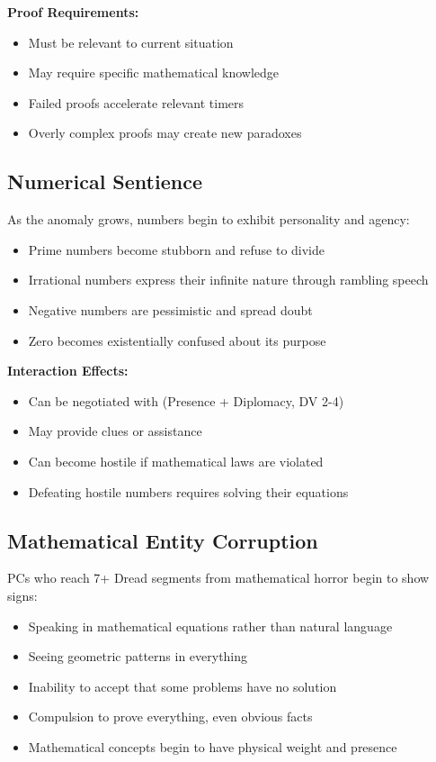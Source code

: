 \documentclass[11pt]{article}
\begin{document}
\textbf{Proof Requirements:}
\begin{itemize}
\item Must be relevant to current situation
\item May require specific mathematical knowledge
\item Failed proofs accelerate relevant timers
\item Overly complex proofs may create new paradoxes
\end{itemize}

\subsection{Numerical Sentience}

As the anomaly grows, numbers begin to exhibit personality and agency:
\begin{itemize}
\item Prime numbers become stubborn and refuse to divide
\item Irrational numbers express their infinite nature through rambling speech
\item Negative numbers are pessimistic and spread doubt
\item Zero becomes existentially confused about its purpose
\end{itemize}

\textbf{Interaction Effects:}
\begin{itemize}
\item Can be negotiated with (Presence + Diplomacy, DV 2-4)
\item May provide clues or assistance
\item Can become hostile if mathematical laws are violated
\item Defeating hostile numbers requires solving their equations
\end{itemize}

\subsection{Mathematical Entity Corruption}

PCs who reach 7+ Dread segments from mathematical horror begin to show signs:
\begin{itemize}
\item Speaking in mathematical equations rather than natural language
\item Seeing geometric patterns in everything
\item Inability to accept that some problems have no solution
\item Compulsion to prove everything, even obvious facts
\item Mathematical concepts begin to have physical weight and presence
\end{itemize}
\end{document}
